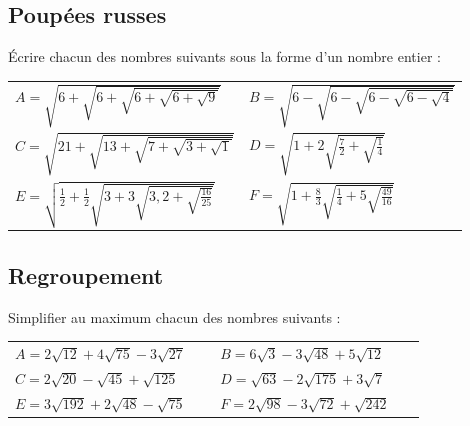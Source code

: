 \documentclass[oneside,12pt]{article}          %
\begin{document}
\subsection{Poupées russes}
Écrire chacun des nombres suivants sous la forme d'un nombre entier :

\renewcommand{\arraystretch}{3.5}
\begin{tabular}{p{0.45\linewidth} p{0.45\linewidth}}
    $A=\sqrt{6+\sqrt{6+\sqrt{6+\sqrt{6+\sqrt{9}}}}}$ & $B=\sqrt{6-\sqrt{6-\sqrt{6-\sqrt{6-\sqrt{4}}}}}$ \\
    $C=\sqrt{21+\sqrt{13+\sqrt{7+\sqrt{3+\sqrt{1}}}}}$ & $D=\sqrt{1+2\sqrt{\frac{7}{2}+\sqrt{\frac{1}{4}}}}$ \\
    $E=\sqrt{\frac{1}{2}+\frac{1}{2}\sqrt{3+3\sqrt{3,2+\sqrt{\frac{16}{25}}}}}$ & $F=\sqrt{1+\frac{8}{3}\sqrt{\frac{1}{4}+5\sqrt{\frac{49}{16}}}}$
\end{tabular}



\subsection{Regroupement}
Simplifier au maximum chacun des nombres suivants :

\renewcommand{\arraystretch}{1.5}
\begin{tabular}{p{0.45\linewidth} p{0.45\linewidth}}
    $A=2\sqrt{12}+4\sqrt{75}-3\sqrt{27}$ & $B=6\sqrt{3}-3\sqrt{48}+5\sqrt{12}$ \\
    $C=2\sqrt{20}-\sqrt{45}+\sqrt{125}$ & $D=\sqrt{63}-2\sqrt{175}+3\sqrt{7}$ \\
    $E=3\sqrt{192}+2\sqrt{48}-\sqrt{75}$ & $F=2\sqrt{98}-3\sqrt{72}+\sqrt{242}$
\end{tabular}
\end{document}
